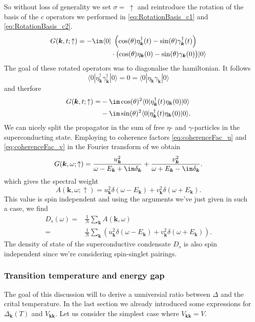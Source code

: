 \documentclass[../main.tex]{subfile}
\begin{document}
So without loss of generality we set $\sigma = ~ \uparrow$ and reintroduce the rotation of the basis of the $c$ operators 
we performed in \ref{eq:RotationBasis_c1} and \ref{eq:RotationBasis_c2}.
\begin{align*}
    G(\bm{k},t; \uparrow) = -\im \langle 0 |&~\left(\cos(\theta) \eta_{\bm{k}}^{\dagger}(t) - \sin(\theta) \gamma_{\bm{k}}^{\dagger}(t)\right)\\
    &\cdot\bigl(\cos(\theta) \eta_{\bm{k}}(0) - \sin(\theta) \gamma_{\bm{k}}(0)\bigr) | 0 \rangle
\end{align*}
The goal of these rotated operators was to diagonalise the hamiltonian. It follows
\[
    \langle 0|\eta_{\bm{k}}^{\dagger}\gamma_{\bm{k}}^{\dagger} | 0\rangle = 0 =  \langle 0|\eta_{\bm{k}}\gamma_{\bm{k}} | 0\rangle
\] 
and therfore
\begin{equation}
    \begin{aligned}
        G(\bm{k},t; \uparrow) =& -\im \cos(\theta)^2 \langle 0 | \eta_{\bm{k}}^{\dagger}(t)\eta_{\bm{k}}(0) | 0 \rangle \\
        & -\im\sin(\theta)^2 \langle 0 | \eta_{\bm{k}}^{\dagger}(t)\eta_{\bm{k}}(0) | 0 \rangle .
    \end{aligned}
\end{equation}
We can nicely split the propagator in the sum of free $\eta$- and $\gamma$-particles in the superconducting state.
Employing to coherence factors \ref{eq:coherenceFac_u} and \ref{eq:coherenceFac_v} in the Fourier transform of we obtain
\[
    G(\bm{k}, \omega; \uparrow) = \frac{u_{\bm{k}}^2}{\omega - E_{\bm{k}} + \im\delta_{\bm{k}}} + \frac{v_{\bm{k}}^2}{\omega + E_{\bm{k}} - \im\delta_{\bm{k}}}.
\]
which gives the spectral weight
\[
    A(\bm{k}, \omega; \uparrow) = u^2_{\bm{k}}\delta(\omega - E_{\bm{k}}) + v^2_{\bm{k}}\delta(\omega + E_{\bm{k}}).
\]
This value is spin independent and using the arguments we've just given in such a case, we find
\begin{align*}
    D_s(\omega) =& \frac{1}{N} \sum_{\bm{k}} A(\bm{k},\omega)\\
        =& \frac{1}{N} \sum_{\bm{k}} \left(u^2_{\bm{k}}\delta(\omega - E_{\bm{k}}) + v^2_{\bm{k}}\delta(\omega + E_{\bm{k}})\right).
\end{align*}
The density of state of the superconductive condensate $D_s$ is also spin independent since we're considering spin-singlet pairings.

\subsubsection{Transition temperature and energy gap}
The goal of this discussion will to derive a unniversial ratio between $\Delta$ and the crital temperature. In the last section 
we already introduced some expressions for $\Delta_{\bm{k}}(T)$ and $V_{\bm{k}\bm{k}}$. Let us consider the simplest case where $V_{\bm{k}\bm{k}} = V$.
\end{document}

